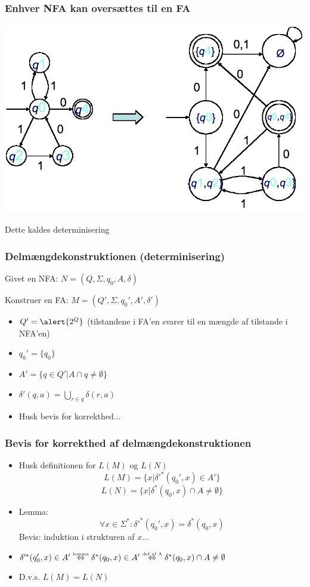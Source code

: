 \begin{frame}
\frametitle{Enhver NFA kan oversættes til en FA}
\begin{center}
  \includegraphics[scale=0.4]{images/2_seminar_convert}
\end{center}
\pause

Dette kaldes determinisering
\end{frame}

\begin{frame}
\frametitle{Delmængdekonstruktionen (determinisering)}
Givet en NFA: $N=(Q, \Sigma, q_0, A, \delta)$

Konstruer en FA: $M=(Q', \Sigma, q_0', A', \delta')$
\pause
\begin{itemize}[<+->]
\item $Q'=\alert{2^{Q}}$ (tilstandene i FA'en svarer til en mængde af tilstande i NFA'en)
\item $q_0' = \{q_0\}$
\item $A' = \{q \in Q' | A \cap q \neq \emptyset \}$
\item $\delta'(q, a) = \bigcup_{r\in q}\delta(r,a)$
\item Husk bevis for korrekthed...
\end{itemize}
\end{frame}
\begin{frame}
  \frametitle{Bevis for korrekthed af delmængdekonstruktionen}
\begin{itemize}[<+->]
\item Husk definitionen for $L(M)$ og $L(N)$
\[L(M) = \{x | \delta'^*(q_0', x) \in A'\}\]
\[L(N) = \{x | \delta^*(q_0, x) \cap A \neq \emptyset\}\]
\item Lemma:
\[\forall x\in \Sigma^*: \delta'^*(q_0', x) = \delta^*(q_0, x)\]
Bevis: induktion i strukturen af $x$...
\item $ \delta'^*(q_0', x) \in A' \overset{\text{\tiny{lemma}}}{\Leftrightarrow} 
 \delta^*(q_0, x) \in A' \overset{\text{\tiny{def af A}}}{\Leftrightarrow} \delta^*(q_0, x) \cap A \neq \emptyset$
\item D.v.s. $L(M)=L(N)$
\end{itemize}
\end{frame}

